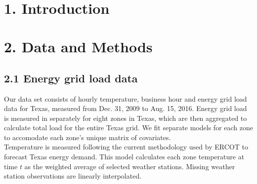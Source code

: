 \documentclass{article}
\title{
\vspace{2in}
\textmd{\textbf{\hmwkTitle}}\\
\normalsize\vspace{0.1in}\small{\hmwkDueDate}\\
\vspace{0.1in}\large{\textit{\hmwkClassInstructor\ }}
\vspace{3in}
}
\author{\textbf{\hmwkAuthorName}}
\date{} %
\begin{document}
\maketitle
\thispagestyle{empty} %

%

\newpage
\section{1. Introduction}






\newpage
\section{2. Data and Methods}

\subsection{2.1 Energy grid load data}

Our data set consists of hourly temperature, business hour and energy grid load data for Texas, measured from Dec. 31, 2009 to Aug. 15, 2016.  Energy grid load is measured in separately for eight zones in Texas, which are then aggregated to calculate total load for the entire Texas grid.  We fit separate models for each zone to accomodate each zone's unique matrix of covariates.\\

Temperature is measured following the current methodology used by ERCOT to forecast Texas energy demand.  This model calculates each zone temperature at time $t$ as the weighted average of selected weather stations. Missing weather station observations are linearly interpolated.
\end{document}
